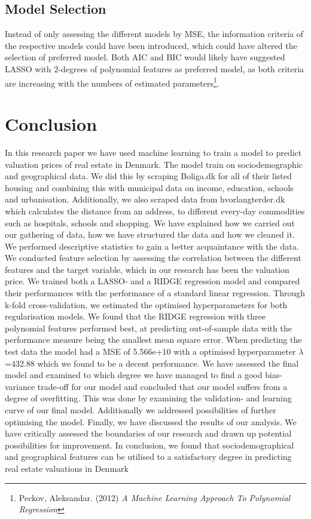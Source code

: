 \documentclass[12pt,a4paper]{article}
\begin{document}
\subsection{Model Selection}
Instead of only assessing the different models by MSE,
the information criteria of the respective models could have been introduced, which could have altered the selection of preferred model. Both AIC and BIC would likely have suggested LASSO with 2-degrees of polynomial features as preferred model, as both criteria are increasing with the numbers of estimated parameters\footnote{Peckov, Aleksandar. (2012)  \textit{A Machine Learning Approach To Polynomial Regression}}. 

\section{Conclusion}
In this research paper we have used machine learning to train a model to predict valuation prices of real estate in Denmark. The model train on sociodemographic and geographical data. \newline We did this by scraping Boliga.dk for all of their listed housing and combining this with municipal data on income, education, schools and urbanisation. Additionally, we also scraped data from hvorlangterder.dk which calculates the distance from an address, to different every-day commodities such as hospitals, schools and shopping. 
We have explained how we carried out our gathering of data, how we have structured the data and how we cleaned it. \newline
We performed descriptive statistics to gain a better acquaintance with the data. 
We conducted feature selection by assessing the correlation between the different features and the target variable, which in our research has been the valuation price. 
We trained both a LASSO- and a RIDGE regression model and compared their performances with the performance of a standard linear regression. Through k-fold cross-validation, we estimated the optimised hyperparameters for both regularisation models. We found that the RIDGE regression with three polynomial features performed best, at predicting out-of-sample data with the performance measure being the smallest mean square error. When predicting the test data the model had a MSE of 5.566e+10 with a optimised hyperparameter $\lambda$=432.88 which we found to be a decent performance. 
We have assessed the final model and examined to which degree we have managed to find a good bias-variance trade-off for our model and concluded that our model suffers from a degree of overfitting. This was done by examining the validation- and learning curve of our final model. Additionally we addressed possibilities of further optimising the model.  \newline
Finally, we have discussed the results of our analysis. We have critically assessed the boundaries of our research and drawn up potential possibilities for improvement. \newline In conclusion, we found that sociodemographical and geographical features can be utilised to a satisfactory degree in predicting real estate valuations in Denmark
\end{document}
